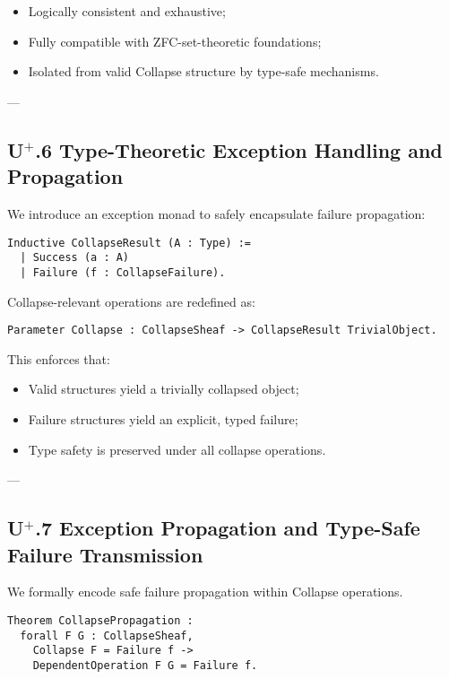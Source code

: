 \documentclass[11pt]{article}
\begin{document}
\begin{itemize}
    \item Logically consistent and exhaustive;
    \item Fully compatible with ZFC-set-theoretic foundations;
    \item Isolated from valid Collapse structure by type-safe mechanisms.
\end{itemize}

---

\subsection*{U$^{+}$.6 Type-Theoretic Exception Handling and Propagation}

We introduce an exception monad to safely encapsulate failure propagation:

\begin{lstlisting}[language=Coq]
Inductive CollapseResult (A : Type) :=
  | Success (a : A)
  | Failure (f : CollapseFailure).
\end{lstlisting}

Collapse-relevant operations are redefined as:

\begin{lstlisting}[language=Coq]
Parameter Collapse : CollapseSheaf -> CollapseResult TrivialObject.
\end{lstlisting}

This enforces that:

\begin{itemize}
    \item Valid structures yield a trivially collapsed object;
    \item Failure structures yield an explicit, typed failure;
    \item Type safety is preserved under all collapse operations.
\end{itemize}

---

\subsection*{U$^{+}$.7 Exception Propagation and Type-Safe Failure Transmission}

We formally encode safe failure propagation within Collapse operations.

\begin{lstlisting}[language=Coq]
Theorem CollapsePropagation :
  forall F G : CollapseSheaf,
    Collapse F = Failure f ->
    DependentOperation F G = Failure f.
\end{lstlisting}
\end{document}
